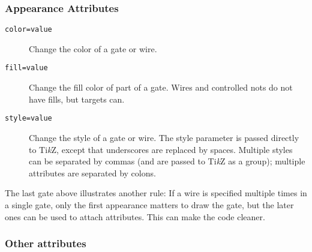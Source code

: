 \documentclass[twoside,12pt]{article}
\newcommand{\TikZ}{Ti\emph{k}Z\xspace}
\begin{document}
\subsubsection{Appearance Attributes}

\begin{description}
\item[{\tt color=value}] Change the color of a gate or wire.

\begin{minipage}[b]{3in}

\end{minipage} \hfill 

\item[{\tt fill=value}] Change the fill color of part of a gate.  Wires and
  controlled nots do not have fills, but targets can.

\begin{minipage}[b]{3.3in}

\end{minipage} \hfill 

\item[{\tt style=value}] Change the style of a gate or wire.  The style parameter is passed directly to \TikZ,
  except that underscores are replaced by spaces.  Multiple styles can be separated
  by commas (and are passed to \TikZ as a group); multiple attributes are separated by
  colons.

\begin{minipage}[b]{3in}

\end{minipage} \hfill 

\end{description}

The last gate above illustrates another rule:
If a wire is specified multiple times in a single gate, only the first
appearance matters to draw the gate, but the later ones can be used to attach
attributes.  This can make the code cleaner.

\begin{minipage}[b]{3in}

\end{minipage} \hfill 

\subsubsection{Other attributes}\label{sec-attributes-other}
\end{document}
